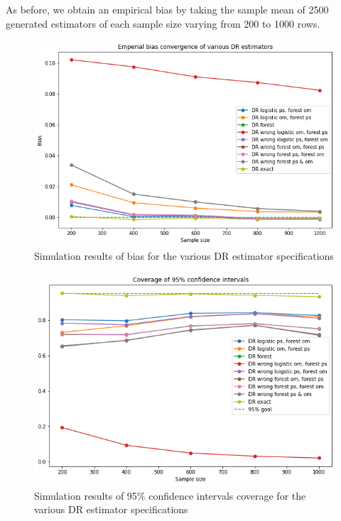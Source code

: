 \documentclass[12pt,twoside]{article}
\begin{document}
As before, we obtain an empirical bias by taking the sample mean of 2500 generated estimators of each sample size varying from 200 to 1000 rows.

\begin{figure}[h!]
    \centering
    \includegraphics[width = 0.9\columnwidth]{figures/rf_2W_bias.png}
    \caption{Simulation results of bias for the various DR estimator specifications}
    \label{figbiaspara}
\end{figure}
\begin{figure}[h!]
    \centering
    \includegraphics[width = 0.9\columnwidth]{figures/rf_2W_CI.png}
    \caption{Simulation results of 95\% confidence intervals coverage for the various DR estimator specifications}
    \label{figCIpara}
\end{figure}
\end{document}
